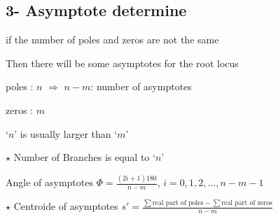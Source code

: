 \documentclass[11pt,a4paper]{article}
\begin{document}
\subsection{3- Asymptote determine}
if the number of poles and zeros are not the same

\hspace*{1em}Then there will be some asymptotes for the root locus

\hspace*{3em}poles : $n$ \quad $\Rightarrow$ $n-m$: number of asymptotes

\hspace*{3em}zeros : $m$

\hspace*{2em}\textcolor{kirmizikalem}{`$n$' is usually larger than `$m$'}

\textcolor{kirmizikalem}{$\star$} Number of Branches is equal to `$n$'

Angle of asymptotes \quad $\displaystyle \Phi=\frac{(2i+1)180}{n-m}$, \quad $i=0,1,2,\ldots,n-m-1$

\medskip
\noindent $\star$ Centroide of asymptotes \quad $\displaystyle s'=\frac{\sum\text{real part of poles}-\sum\text{real part of zeros}}{n-m}$
\end{document}
